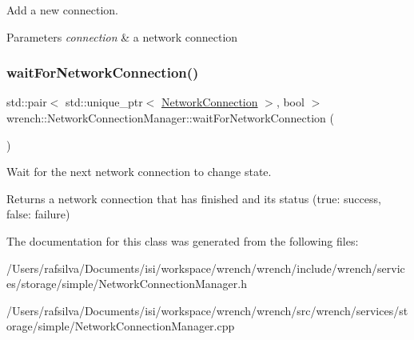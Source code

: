 Add a new connection. 


\begin{DoxyParams}{Parameters}
{\em connection} & a network connection \\
\hline
\end{DoxyParams}
\mbox{\label{classwrench_1_1_network_connection_manager_ae393426d265b864afe001ff4d887c5de}} 
\subsubsection{\texorpdfstring{wait\+For\+Network\+Connection()}{waitForNetworkConnection()}}
{\footnotesize\ttfamily std\+::pair$<$ std\+::unique\+\_\+ptr$<$ \hyperlink{classwrench_1_1_network_connection}{Network\+Connection} $>$, bool $>$ wrench\+::\+Network\+Connection\+Manager\+::wait\+For\+Network\+Connection (\begin{DoxyParamCaption}{ }\end{DoxyParamCaption})}



Wait for the next network connection to change state. 

\begin{DoxyReturn}{Returns}
a network connection that has finished and its status (true\+: success, false\+: failure) 
\end{DoxyReturn}


The documentation for this class was generated from the following files\+:\begin{DoxyCompactItemize}
\item 
/\+Users/rafsilva/\+Documents/isi/workspace/wrench/wrench/include/wrench/services/storage/simple/Network\+Connection\+Manager.\+h\item 
/\+Users/rafsilva/\+Documents/isi/workspace/wrench/wrench/src/wrench/services/storage/simple/Network\+Connection\+Manager.\+cpp\end{DoxyCompactItemize}
